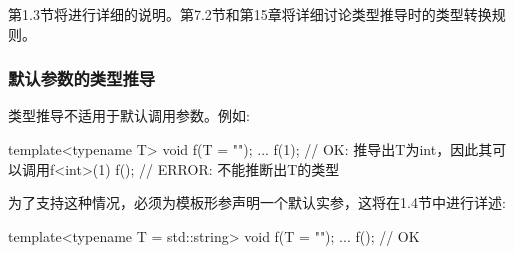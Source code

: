 第1.3节将进行详细的说明。第7.2节和第15章将详细讨论类型推导时的类型转换规则。

\subsubsection{默认参数的类型推导}

类型推导不适用于默认调用参数。例如:

\begin{cpp}
template<typename T>
void f(T = "");
...
f(1); // OK: 推导出T为int，因此其可以调用f<int>(1)
f(); // ERROR: 不能推断出T的类型
\end{cpp}

为了支持这种情况，必须为模板形参声明一个默认实参，这将在1.4节中进行详述:

\begin{cpp}
template<typename T = std::string>
void f(T = "");
...
f(); // OK
\end{cpp}














